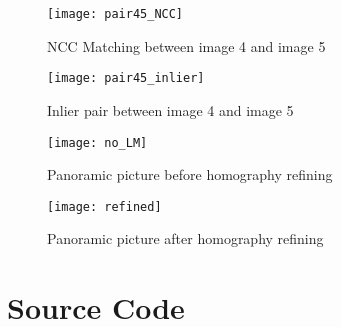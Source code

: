 \documentclass[11pt]{article}
\begin{document}
\begin{figure}[H]
\centering
\texttt{[image: pair45\_NCC]}
\caption{NCC Matching between image 4 and image 5}
\label{}
\end{figure}
\begin{figure}[H]
\centering
\texttt{[image: pair45\_inlier]}
\caption{Inlier pair between image 4 and image 5}
\label{}
\end{figure}

\begin{figure}[H]
\centering
\texttt{[image: no\_LM]}
\caption{Panoramic picture before homography refining}
\label{}
\end{figure}
\begin{figure}[H]
\centering
\texttt{[image: refined]}
\caption{Panoramic picture after homography refining}
\label{}
\end{figure}




\section*{Source Code}
\end{document}
